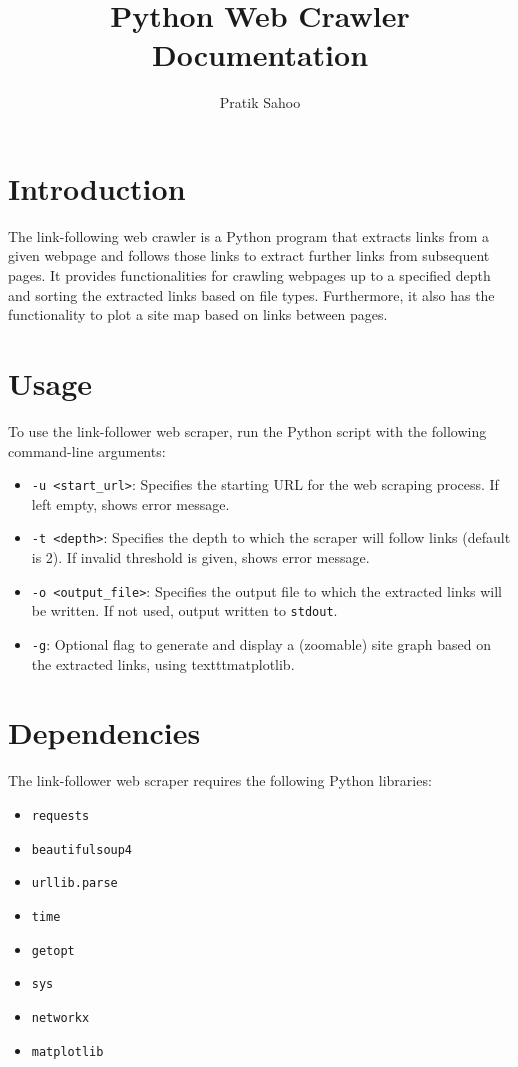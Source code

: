\documentclass{article}
\title{Python Web Crawler Documentation}
\author{Pratik Sahoo}
\begin{document}
\maketitle

\section{Introduction}
The link-following web crawler \cite{link_follower} is a Python program that extracts links from a given webpage and follows those links to extract further links from subsequent pages. It provides functionalities for crawling webpages up to a specified depth and sorting the extracted links based on file types. Furthermore, it also has the functionality to plot a site map based on links between pages.

\section{Usage}
To use the link-follower web scraper, run the Python script with the following command-line arguments:

\begin{itemize}
  \item \texttt{-u <start\_url>}: Specifies the starting URL for the web scraping process. If left empty, shows error message.
  \item \texttt{-t <depth>}: Specifies the depth to which the scraper will follow links (default is 2). If invalid threshold is given, shows error message. 
  \item \texttt{-o <output\_file>}: Specifies the output file to which the extracted links will be written. If not used, output written to \texttt{stdout}.
  \item \texttt{-g}: Optional flag to generate and display a (zoomable) site graph based on the extracted links, using texttt{matplotlib}.
\end{itemize}

\section{Dependencies}
The link-follower web scraper requires the following Python libraries:

\begin{itemize}
  \item \texttt{requests}
  \item \texttt{beautifulsoup4} \cite{richardson2007}
  \item \texttt{urllib.parse}
  \item \texttt{time}
  \item \texttt{getopt}
  \item \texttt{sys}
  \item \texttt{networkx} \cite{networkx}
  \item \texttt{matplotlib}
\end{itemize}
\end{document}
